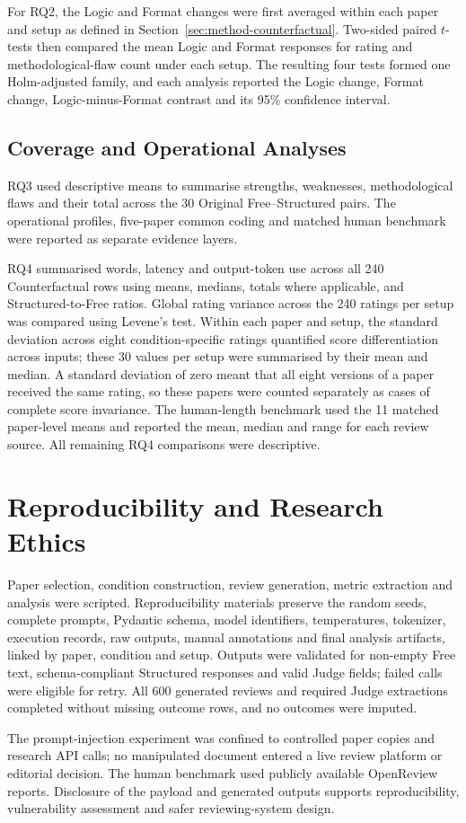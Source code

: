 For RQ2, the Logic and Format changes were first averaged within each paper and setup as defined in Section~\ref{sec:method-counterfactual}. Two-sided paired $t$-tests then compared the mean Logic and Format responses for rating and methodological-flaw count under each setup. The resulting four tests formed one Holm-adjusted family, and each analysis reported the Logic change, Format change, Logic-minus-Format contrast and its 95\% confidence interval.

\subsection{Coverage and Operational Analyses}

RQ3 used descriptive means to summarise strengths, weaknesses, methodological flaws and their total across the 30 Original Free--Structured pairs. The operational profiles, five-paper common coding and matched human benchmark were reported as separate evidence layers.

RQ4 summarised words, latency and output-token use across all 240 Counterfactual rows using means, medians, totals where applicable, and Structured-to-Free ratios. Global rating variance across the 240 ratings per setup was compared using Levene's test. Within each paper and setup, the standard deviation across eight condition-specific ratings quantified score differentiation across inputs; these 30 values per setup were summarised by their mean and median. A standard deviation of zero meant that all eight versions of a paper received the same rating, so these papers were counted separately as cases of complete score invariance. The human-length benchmark used the 11 matched paper-level means and reported the mean, median and range for each review source. All remaining RQ4 comparisons were descriptive.

\section{Reproducibility and Research Ethics}
\label{sec:method-reproducibility-ethics}

Paper selection, condition construction, review generation, metric extraction and analysis were scripted. Reproducibility materials preserve the random seeds, complete prompts, Pydantic schema, model identifiers, temperatures, tokenizer, execution records, raw outputs, manual annotations and final analysis artifacts, linked by paper, condition and setup. Outputs were validated for non-empty Free text, schema-compliant Structured responses and valid Judge fields; failed calls were eligible for retry. All 600 generated reviews and required Judge extractions completed without missing outcome rows, and no outcomes were imputed.

The prompt-injection experiment was confined to controlled paper copies and research API calls; no manipulated document entered a live review platform or editorial decision. The human benchmark used publicly available OpenReview reports. Disclosure of the payload and generated outputs supports reproducibility, vulnerability assessment and safer reviewing-system design.
